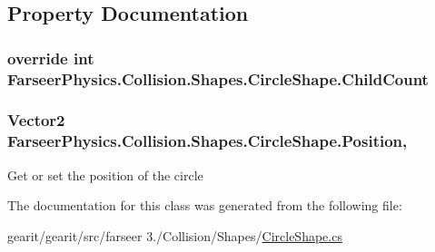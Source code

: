 \subsection{Property Documentation}
\hypertarget{class_farseer_physics_1_1_collision_1_1_shapes_1_1_circle_shape_abca7822d6342bd26fb2027cca1983700}{
\subsubsection[{Child\+Count}]{\setlength{\rightskip}{0pt plus 5cm}override int Farseer\+Physics.\+Collision.\+Shapes.\+Circle\+Shape.\+Child\+Count\hspace{0.3cm}{\ttfamily [get]}}}\label{class_farseer_physics_1_1_collision_1_1_shapes_1_1_circle_shape_abca7822d6342bd26fb2027cca1983700}
\hypertarget{class_farseer_physics_1_1_collision_1_1_shapes_1_1_circle_shape_a69baea6b10dd73fed965f11a06965618}{
\subsubsection[{Position}]{\setlength{\rightskip}{0pt plus 5cm}Vector2 Farseer\+Physics.\+Collision.\+Shapes.\+Circle\+Shape.\+Position\hspace{0.3cm}{\ttfamily [get]}, {\ttfamily [set]}}}\label{class_farseer_physics_1_1_collision_1_1_shapes_1_1_circle_shape_a69baea6b10dd73fed965f11a06965618}


Get or set the position of the circle 



The documentation for this class was generated from the following file\+:\begin{DoxyCompactItemize}
\item 
gearit/gearit/src/farseer 3./\+Collision/\+Shapes/\hyperlink{_circle_shape_8cs}{Circle\+Shape.\+cs}\end{DoxyCompactItemize}
